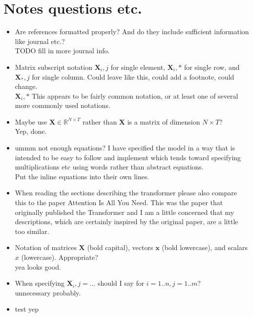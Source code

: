 \documentclass[conference]{IEEEtran}
\begin{document}
\section{Notes questions etc.} 
\begin{itemize}
	\item Are references formatted properly? And do they include sufficient information like journal etc.? \\
	TODO fill in more journal info.
	\item Matrix subscript notation $\boldsymbol{X}_i,j$ for single element, $\boldsymbol{X}_i,*$ for single row, and $\boldsymbol{X}_*,j$ for single column. Could leave like this, could add a footnote, could change. \\
	$\boldsymbol{X}_i,*$ This appears to be fairly common notation, or at least one of several more commonly used notations.
	\item Maybe use $\boldsymbol{X} \in \mathbb{R}^{N \times T}$ rather than $\boldsymbol{X}$ is a matrix of dimension $N \times T$? \\
	Yep, done.
	\item ummm not enough equations? I have specified the model in a way that is intended to be easy to follow and implement which tends toward specifying multiplications etc using words rather than abstract equations.\\
	Put the inline equations into their own lines.
	\item When reading the sections describing the transformer please also compare this to the paper Attention Is All You Need. This was the paper that originally published the Transformer and I am a little concerned that my descriptions, which are certainly inspired by the original paper, are a little too similar.
	\item Notation of matrices $\boldsymbol{X}$ (bold capital), vectors $\boldsymbol{x}$ (bold lowercase), and scalars $x$ (lowercase). Appropriate? \\
	yea looks good.
	\item When specifying $\boldsymbol{X}_i,j = ...$ should I say for $i= 1..n, j= 1..m$? \\
	unnecessary probably.
	\item test yep
\end{itemize}
\end{document}
